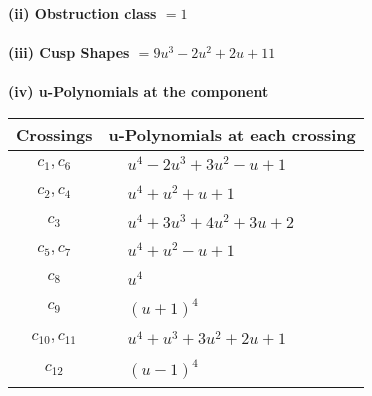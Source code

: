 \documentclass[1p]{elsarticle_modified}
\theoremstyle{definition}
\begin{document}
\flushleft \textbf{(ii) Obstruction class $= 1$}\\~\\
\flushleft \textbf{(iii) Cusp Shapes $= 9 u^3-2 u^2+2 u+11$}\\~\\
\newpage\renewcommand{\arraystretch}{1}
\flushleft \textbf{(iv) u-Polynomials at the component}\newline \\
\begin{tabular}{m{50pt}|m{274pt}}
Crossings & \hspace{64pt}u-Polynomials at each crossing \\
\hline $$\begin{aligned}c_{1},c_{6}\end{aligned}$$&$\begin{aligned}
&u^4-2 u^3+3 u^2- u+1
\end{aligned}$\\
\hline $$\begin{aligned}c_{2},c_{4}\end{aligned}$$&$\begin{aligned}
&u^4+u^2+u+1
\end{aligned}$\\
\hline $$\begin{aligned}c_{3}\end{aligned}$$&$\begin{aligned}
&u^4+3 u^3+4 u^2+3 u+2
\end{aligned}$\\
\hline $$\begin{aligned}c_{5},c_{7}\end{aligned}$$&$\begin{aligned}
&u^4+u^2- u+1
\end{aligned}$\\
\hline $$\begin{aligned}c_{8}\end{aligned}$$&$\begin{aligned}
&u^4
\end{aligned}$\\
\hline $$\begin{aligned}c_{9}\end{aligned}$$&$\begin{aligned}
&(u+1)^4
\end{aligned}$\\
\hline $$\begin{aligned}c_{10},c_{11}\end{aligned}$$&$\begin{aligned}
&u^4+u^3+3 u^2+2 u+1
\end{aligned}$\\
\hline $$\begin{aligned}c_{12}\end{aligned}$$&$\begin{aligned}
&(u-1)^4
\end{aligned}$\\
\hline
\end{tabular}\\~\\
\end{document}
